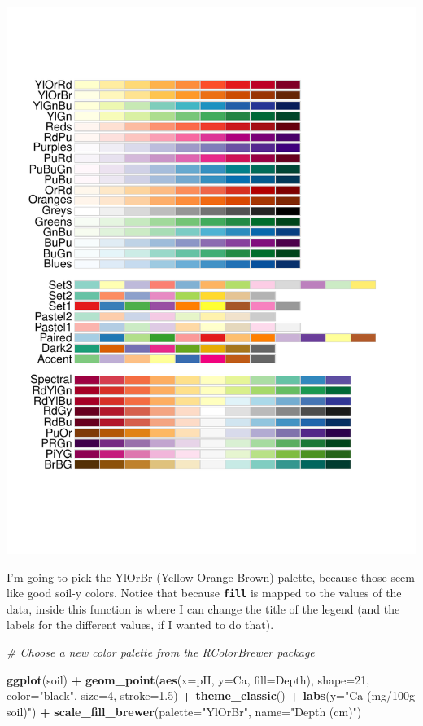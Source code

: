 \documentclass[
]{article}
\newenvironment{Shaded}{\begin{snugshade}}{\end{snugshade}}
\newcommand{\AttributeTok}[1]{\textcolor[rgb]{0.13,0.29,0.53}{#1}}
\newcommand{\CommentTok}[1]{\textcolor[rgb]{0.56,0.35,0.01}{\textit{#1}}}
\newcommand{\DecValTok}[1]{\textcolor[rgb]{0.00,0.00,0.81}{#1}}
\newcommand{\FloatTok}[1]{\textcolor[rgb]{0.00,0.00,0.81}{#1}}
\newcommand{\FunctionTok}[1]{\textcolor[rgb]{0.13,0.29,0.53}{\textbf{#1}}}
\newcommand{\NormalTok}[1]{#1}
\newcommand{\SpecialCharTok}[1]{\textcolor[rgb]{0.81,0.36,0.00}{\textbf{#1}}}
\newcommand{\StringTok}[1]{\textcolor[rgb]{0.31,0.60,0.02}{#1}}
\begin{document}
\includegraphics{module1_3_files/figure-latex/unnamed-chunk-33-1.pdf}

I'm going to pick the YlOrBr (Yellow-Orange-Brown) palette, because
those seem like good soil-y colors. Notice that because
\textbf{\texttt{fill}} is mapped to the values of the data, inside this
function is where I can change the title of the legend (and the labels
for the different values, if I wanted to do that).

\begin{Shaded}
\begin{Highlighting}[]
\CommentTok{\# Choose a new color palette from the RColorBrewer package}

\FunctionTok{ggplot}\NormalTok{(soil) }\SpecialCharTok{+}
  \FunctionTok{geom\_point}\NormalTok{(}\FunctionTok{aes}\NormalTok{(}\AttributeTok{x=}\NormalTok{pH, }\AttributeTok{y=}\NormalTok{Ca, }\AttributeTok{fill=}\NormalTok{Depth), }\AttributeTok{shape=}\DecValTok{21}\NormalTok{, }\AttributeTok{color=}\StringTok{"black"}\NormalTok{, }\AttributeTok{size=}\DecValTok{4}\NormalTok{, }\AttributeTok{stroke=}\FloatTok{1.5}\NormalTok{) }\SpecialCharTok{+}
  \FunctionTok{theme\_classic}\NormalTok{() }\SpecialCharTok{+}
  \FunctionTok{labs}\NormalTok{(}\AttributeTok{y=}\StringTok{"Ca (mg/100g soil)"}\NormalTok{) }\SpecialCharTok{+}
  \FunctionTok{scale\_fill\_brewer}\NormalTok{(}\AttributeTok{palette=}\StringTok{"YlOrBr"}\NormalTok{, }\AttributeTok{name=}\StringTok{"Depth (cm)"}\NormalTok{)}
\end{Highlighting}
\end{Shaded}
\end{document}
